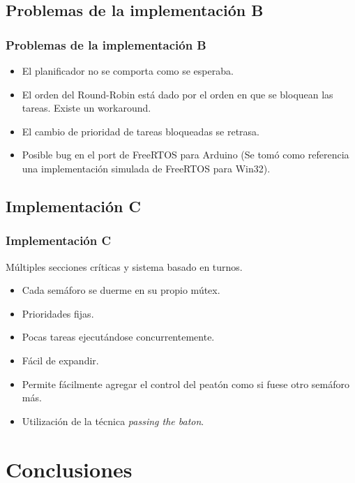 \subsection{Problemas de la implementación B}
\begin{frame}
\frametitle{Problemas de la implementación B}
\begin{block}{}
	\begin{itemize}
		\item El planificador no se comporta como se esperaba.
		\item El orden del Round-Robin está dado por el orden en que se bloquean las tareas. Existe un workaround.
		\item El cambio de prioridad de tareas bloqueadas se retrasa.
		\item Posible bug en el port de FreeRTOS para Arduino (Se tomó como referencia una implementación simulada de FreeRTOS para Win32).
	\end{itemize}
\end{block}
\end{frame}

\subsection{Implementación C}
\begin{frame}
\frametitle{Implementación C}
\begin{block}{Múltiples secciones críticas y sistema basado en turnos.}
	\begin{itemize}
		\item Cada semáforo se duerme en su propio mútex.
		\item Prioridades fijas.
		\item Pocas tareas ejecutándose concurrentemente.
		\item Fácil de expandir.
		\item Permite fácilmente agregar el control del peatón como si fuese otro semáforo más.
		\item Utilización de la técnica \emph{passing the baton}.
	\end{itemize}
\end{block}
\end{frame}

\section{Conclusiones}

